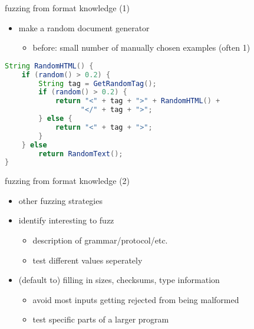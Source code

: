 
\begin{frame}[fragile,label=formatKnow]{fuzzing from format knowledge (1)}
    \begin{itemize}
        \item make a random document generator
            \begin{itemize}
                \item before: small number of manually chosen examples (often 1)
            \end{itemize}
    \end{itemize}
    \begin{lstlisting}[language=Java, style=small]
String RandomHTML() {
    if (random() > 0.2) {
        String tag = GetRandomTag();
        if (random() > 0.2) {
            return "<" + tag + ">" + RandomHTML() +
                  "</" + tag + ">";
        } else {
            return "<" + tag + ">";
        }
    } else
        return RandomText();
}
\end{lstlisting}
\end{frame}

\begin{frame}[fragile,label=formatKnow2]{fuzzing from format knowledge (2)}
    \begin{itemize}
        \item other fuzzing strategies
        \vspace{.5cm}
    \item identify interesting  to fuzz
            \begin{itemize}
                \item description of grammar/protocol/etc.
                \item test different values seperately
            \end{itemize}
        \item (default to) filling in sizes, checksums, type information
            \begin{itemize}
                \item avoid most inputs getting rejected from being malformed
                \item test specific parts of a larger program
            \end{itemize}
    \end{itemize}
\end{frame}


